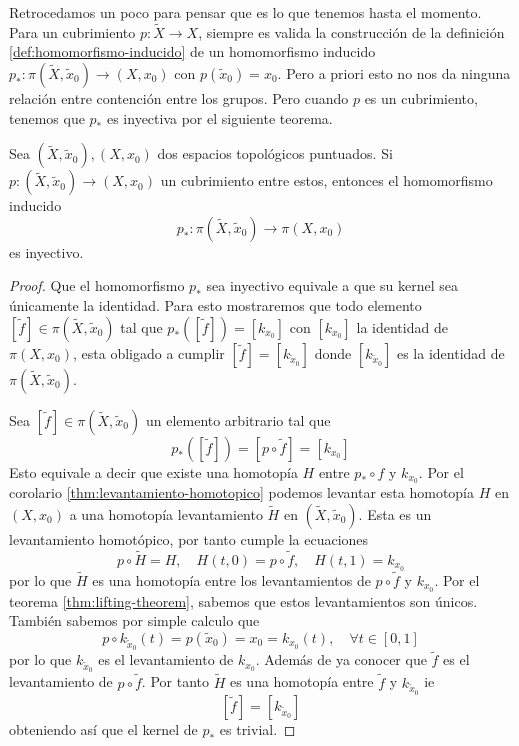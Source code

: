 Retrocedamos un poco para pensar que es lo que tenemos hasta el momento.
Para un cubrimiento \(p : \tilde X \to X\), siempre es valida la
construcción de la definición \ref{def:homomorfismo-inducido} de un
homomorfismo inducido \(p_* : \pi \left( \tilde X , \tilde x _0 \right)
\to \left( X , x_0 \right)\) con \(p (\tilde x_0) = x_0\). Pero a priori
esto no nos da ninguna relación entre contención entre los grupos. Pero
cuando \(p\) es un cubrimiento, tenemos que \(p_*\) es inyectiva por el
siguiente teorema.

\begin{teorema}
  \label{thm:inyec-covering}
  Sea \(\left( \tilde X, \tilde x_0 \right), \left( X, x_0 \right)\)
  dos espacios topológicos puntuados. Si \(p : \left( \tilde X, \tilde x_0
  \right) \to \left( X, x_0 \right)\) un cubrimiento entre estos,
  entonces el homomorfismo inducido
  \[ p_* : \pi \left( \tilde X, \tilde x_0 \right) \longrightarrow \pi
    \left( X, x_0 \right)\]
  es inyectivo.
\end{teorema}
\begin{proof}
  Que el homomorfismo \(p_*\) sea inyectivo equivale a que su
  kernel sea únicamente la identidad. Para esto
mostraremos que todo elemento \([\tilde f] \in \pi
(\tilde X , \tilde x_0)\) tal que \(p_* ([\tilde f]) = [k_{x _0}]\) con \([k_{ x _0}]\)
la identidad de \(\pi (X, x_0)\), esta obligado a cumplir \([\tilde f] =
[k_{\tilde x _0}]\) donde \([k_{\tilde x _0}]\) es la identidad de \(\pi (\tilde X ,
\tilde x _0)\).

Sea \([\tilde f] \in \pi (\tilde X, \tilde x _0)\) un elemento
arbitrario tal que
\[p_* ([\tilde f]) = [p \circ \tilde f] = [k_{ x _0}]\]
Esto equivale a decir que existe una homotopía \(H\) entre \(p_* \circ
f\) y \(k_{x _0}\). Por el corolario \ref{thm:levantamiento-homotopico} podemos
levantar esta homotopía \(H\) en \((X, x_0)\) a una homotopía
levantamiento \(\tilde H\) en \((\tilde X , \tilde x _0)\). Esta es un
levantamiento homotópico, por tanto cumple la ecuaciones
\[ p \circ \tilde H = H, \quad H (t, 0) = p \circ \tilde f, \quad H (t,
  1) = k_{x _0} \]
por lo que \(\tilde H\) es una homotopía entre los levantamientos de \(p
\circ \tilde f\) y \(k_{x _0}\). Por el teorema \ref{thm:lifting-theorem},
sabemos que estos levantamientos son únicos. También sabemos por simple
calculo que
\[ p \circ k_{\tilde x _0} (t) = p \left( \tilde x_0 \right) = x_0 =
  k_{x_0} (t) ,\quad \forall t \in [0,1] \]
por lo que \(k_{\tilde x _0}\) es el levantamiento de \(k_{x_0}\).
Además de ya conocer que \(\tilde f\) es el levantamiento de \(p \circ
\tilde f\). Por tanto \(\tilde H\) es una homotopía entre \(\tilde f\) y
\(k_{\tilde x _0}\) ie
\[[\tilde f] = [k_{\tilde x_0}]\]
obteniendo así que el kernel de \(p_*\) es trivial.
\end{proof}

